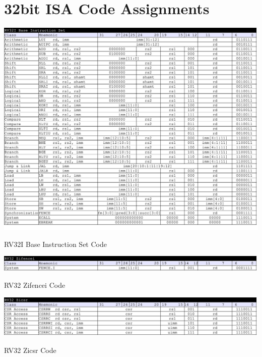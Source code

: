 \section{32bit ISA Code Assignments}

\begin{table}[H]
    \includegraphics[width=1.00\columnwidth]{./Table/ISACode_RV32I.png}
    \caption{RV32I Base Instruction Set Code}
    \label{tb:ISACode_RV32I}
\end{table}

\begin{table}[H]
    \includegraphics[width=1.00\columnwidth]{./Table/ISACode_RV32Zifencei.png}
    \caption{RV32 Zifencei Code}
    \label{tb:ISACode_RV32Zifencei}
\end{table}

\begin{table}[H]
    \includegraphics[width=1.00\columnwidth]{./Table/ISACode_RV32Zicsr.png}
    \caption{RV32 Zicsr Code}
    \label{tb:ISACode_RV32Zicsr}
\end{table}

